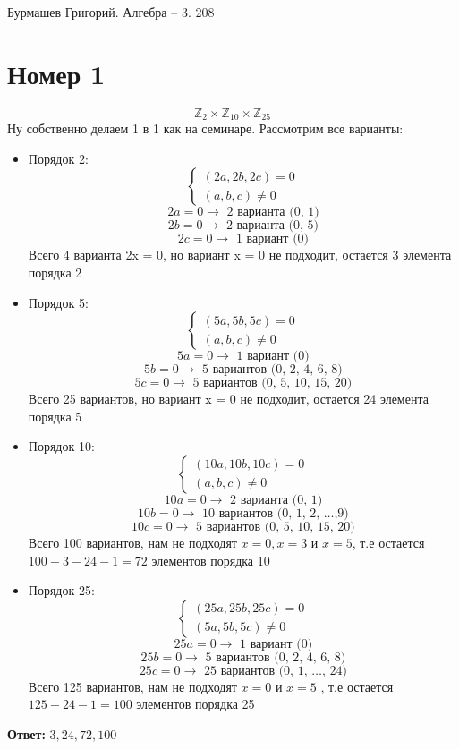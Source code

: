 \documentclass[a4paper,12pt, fleqn]{article}
\author{Бурмашев Григорий, БПМИ-208}
\title{}
\date{\today}
\begin{document}
\begin{center}
Бурмашев Григорий. Алгебра -- 3. 208
\end{center}
\section*{Номер 1}
\[
\mathbb{Z}_{2} \times \mathbb{Z}_{10} \times \mathbb{Z}_{25}
\]
Ну собственно  делаем 1 в 1 как на семинаре. Рассмотрим все варианты:
\begin{itemize}
\item Порядок 2:
\[
\begin{cases}
(2a, 2b, 2c) = 0 \\
(a, b, c) \neq 0
\end{cases}
\]
\[
2a = 0 \rightarrow \text{ 2 варианта (0, 1)}
\]
\[
2b = 0 \rightarrow \text{ 2 варианта (0, 5)}
\]
\[
2c = 0 \rightarrow \text{ 1 вариант (0)}
\]
Всего 4 варианта 2x = 0, но вариант x = 0 не подходит, остается 3 элемента порядка 2
\item Порядок 5:
\[
\begin{cases}
(5a, 5b, 5c ) = 0 \\
(a, b, c) \neq 0
\end{cases}
\]
\[
5a = 0 \rightarrow \text{ 1 вариант (0)}
\]
\[
5b = 0 \rightarrow \text{ 5 вариантов (0, 2, 4, 6, 8)}
\]
\[
5c = 0 \rightarrow \text{ 5 вариантов (0, 5, 10, 15, 20)}
\]
Всего 25 вариантов, но вариант x = 0 не подходит, остается 24 элемента порядка 5 
\item Порядок 10:
\[
\begin{cases}
(10a, 10b, 10c ) = 0 \\
(a, b, c) \neq 0
\end{cases}
\]
\[
10a = 0 \rightarrow \text{ 2 варианта (0, 1)}
\]
\[
10b = 0 \rightarrow \text{ 10 вариантов (0, 1, 2, \ldots,9)}
\]
\[
10c = 0 \rightarrow \text{ 5 вариантов (0, 5, 10, 15, 20)}
\]
Всего 100 вариантов, нам не подходят $x = 0, x = 3$ и $x = 5$, т.е остается  $100 - 3 - 24 -1 = 72$ элементов порядка 10
\clearpage
\item Порядок 25:
\[
\begin{cases}
(25a, 25b, 25c ) = 0 \\
(5a, 5b, 5c) \neq 0
\end{cases}
\]
\[
25a = 0 \rightarrow \text{ 1 вариант (0)}
\]
\[
25b = 0 \rightarrow \text{ 5 вариантов (0, 2, 4, 6, 8)}
\]
\[
25c = 0 \rightarrow \text{ 25 вариантов (0, 1, \ldots, 24)}
\]
Всего 125 вариантов, нам не подходят $x = 0$ и $x = 5$ , т.е  остается $125 - 24 - 1 = 100$ элементов порядка 25
\end{itemize}
\begin{center}
\textbf{Ответ: } $3, 24, 72, 100$
\end{center}
\end{document}

